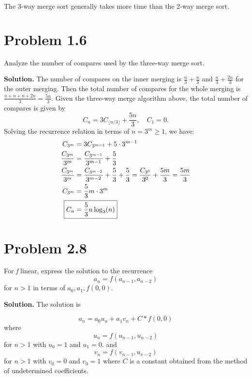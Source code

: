 \documentclass[a4paper, 11pt]{article}
\begin{document}
The 3-way merge sort generally takes more time than the 2-way merge sort.

\section{Problem 1.6} Analyze the number of compares used by the three-way merge sort.

\textbf{Solution.} The number of compares on the inner merging is $\frac{n}{3} + \frac{n}{3}$ and $\frac{n}{3} + \frac{2n}{3}$ for the outer merging. Then the total number of compares for the whole merging is $\frac{n + n + n + 2n}{3} = \frac{5n}{3}$. Given the three-way merge algorithm above, the total number of compares is given by
\begin{equation*}
C_n = 3C_{\lfloor n/3 \rfloor} + \frac{5n}{3}, \quad C_1 = 0.
\end{equation*}
Solving the recurrence relation in terms of $n = 3^m \geq 1$, we have:
\begin{align*}
C_{3^m} &= 3C_{3^{m-1}} + 5 \cdot 3^{m-1}\\
\frac{C_{3^m}}{3^m} &= \frac{C_{3^{m-1}}}{3^{m-1}} + \frac{5}{3}\\
\frac{C_{3^m}}{3^m} &= \frac{C_{3^{m-2}}}{3^{m-2}} + \frac{5}{3} + \frac{5}{3} = \frac{C_{3^0}}{3^0} + \frac{5m}{3} = \frac{5m}{3}\\
C_{3^m} &= \frac{5}{3}m \cdot 3^m\\
\Aboxed{
C_n &= \frac{5}{3}n \log_3(n)}
\end{align*}

\section{Problem 2.8} For \textit{f} linear, express the solution to the recurrence
\begin{equation*}
a_n = f(a_{n-1}, a_{n-2})
\end{equation*}
for $n>1$  in terms of $a_0, a_1, f(0, 0)$.

\textbf{Solution.} The solution is

\begin{equation*}
a_n = a_0 u_n + a_1 v_n + C*f(0,0)
\end{equation*}
where
\begin{equation*}
	u_n = f(u_{n-1}, u_{n-2})
\end{equation*}
for $n>1$ with $u_0=1$ and $u_1=0$.
and 
\begin{equation*}
v_n = f(v_{n-1}, u_{v-2})
\end{equation*}
for $n>1$ with $v_0=0$ and $v_0=1$ where $C$ is a constant obtained from the method of undetermined coefficients.
\end{document}
